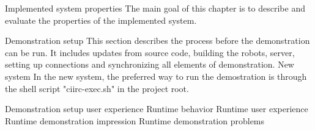 \chap Implemented system properties
The main goal of this chapter is to describe and evaluate the properties of the implemented system.

\sec Demonstration setup
This section describes the process before the demonstration can be run. It includes updates from source code, building the robots, server, setting up connections and synchronizing all elements of demonstration.
\secc New system
In the new system, the preferred way to run the demostration is through the shell script "ciirc-exec.sh" in the project root.

\sec Demonstration setup user experience
\sec Runtime behavior
\sec Runtime user experience
\sec Runtime demonstration impression
\sec Runtime demonstration problems